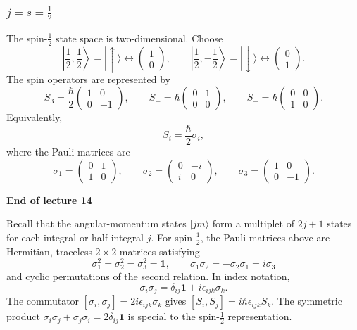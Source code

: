 \documentclass[11pt,a4paper]{article}
\begin{document}
\subsubsection*{$j=s=\frac12$}

The spin-$\frac12$ state space is two-dimensional. Choose
\[
    \left|\frac12,\frac12\right\rangle
       =|\uparrow\rangle\longleftrightarrow
          \begin{pmatrix}1\\0\end{pmatrix},\qquad
    \left|\frac12,-\frac12\right\rangle
       =|\downarrow\rangle\longleftrightarrow
          \begin{pmatrix}0\\1\end{pmatrix}.
\]
The spin operators are represented by
\[
    S_3=\frac\hbar2\begin{pmatrix}1&0\\0&-1\end{pmatrix},
    \qquad
    S_+=\hbar\begin{pmatrix}0&1\\0&0\end{pmatrix},
    \qquad
    S_-=\hbar\begin{pmatrix}0&0\\1&0\end{pmatrix}.
\]
Equivalently,
\[
    S_i=\frac\hbar2\sigma_i,
\]
where the Pauli matrices are
\[
    \sigma_1=\begin{pmatrix}0&1\\1&0\end{pmatrix},\qquad
    \sigma_2=\begin{pmatrix}0&-i\\i&0\end{pmatrix},\qquad
    \sigma_3=\begin{pmatrix}1&0\\0&-1\end{pmatrix}.
\]

\begin{center}
    \textbf{End of lecture 14}
\end{center}
Recall that the angular-momentum states $|jm\rangle$ form a multiplet
of $2j+1$ states for each integral or half-integral $j$. For spin
$\frac12$, the Pauli matrices above are Hermitian, traceless $2\times2$
matrices satisfying
\[
    \sigma_1^2=\sigma_2^2=\sigma_3^2=\mathbf 1,\qquad
    \sigma_1\sigma_2=-\sigma_2\sigma_1=i\sigma_3
\]
and cyclic permutations of the second relation. In index notation,
\[
    \sigma_i\sigma_j=\delta_{ij}\mathbf 1+i\epsilon_{ijk}\sigma_k.
\]
The commutator $[\sigma_i,\sigma_j]=2i\epsilon_{ijk}\sigma_k$
gives $[S_i,S_j]=i\hbar\epsilon_{ijk}S_k$. The symmetric product
$\sigma_i\sigma_j+\sigma_j\sigma_i=2\delta_{ij}\mathbf 1$
is special to the spin-$\frac12$ representation.
\end{document}
